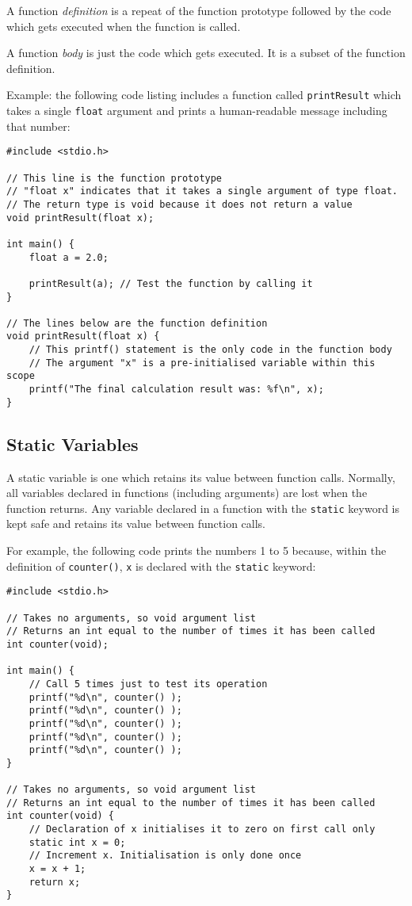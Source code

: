 \documentclass{lab}
\begin{document}
A function \textit{definition} is a repeat of the function prototype followed by the code which gets executed when the function is called.

A function \textit{body} is just the code which gets executed. It is a subset of the function definition.

Example: the following code listing includes a function called \texttt{printResult} which takes a single \texttt{float} argument and prints a human-readable message including that number:

\begin{lstlisting}[style=CStyle]
#include <stdio.h>

// This line is the function prototype
// "float x" indicates that it takes a single argument of type float.
// The return type is void because it does not return a value
void printResult(float x);

int main() {
	float a = 2.0;
	
	printResult(a); // Test the function by calling it
}

// The lines below are the function definition
void printResult(float x) {
	// This printf() statement is the only code in the function body
	// The argument "x" is a pre-initialised variable within this scope
	printf("The final calculation result was: %f\n", x);
}
\end{lstlisting}

\pagebreak
\subsection{Static Variables}

A static variable is one which retains its value between function calls. Normally, all variables declared in functions (including arguments) are lost when the function returns. Any variable declared in a function with the \texttt{static} keyword is kept safe and retains its value between function calls.

For example, the following code prints the numbers 1 to 5 because, within the definition of \texttt{counter()}, \texttt{x} is declared with the \texttt{static} keyword:

\begin{lstlisting}[style=CStyle]
#include <stdio.h>

// Takes no arguments, so void argument list
// Returns an int equal to the number of times it has been called
int counter(void); 

int main() {
	// Call 5 times just to test its operation
	printf("%d\n", counter() );
	printf("%d\n", counter() );
	printf("%d\n", counter() );
	printf("%d\n", counter() );
	printf("%d\n", counter() );
}
	
// Takes no arguments, so void argument list
// Returns an int equal to the number of times it has been called
int counter(void) {
	// Declaration of x initialises it to zero on first call only
	static int x = 0;
	// Increment x. Initialisation is only done once
	x = x + 1;
	return x;
}
\end{lstlisting}
\end{document}
